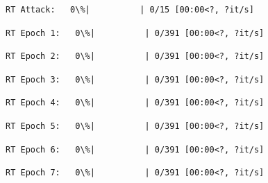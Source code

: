 \documentclass[11pt]{article}
\begin{document}
    
    \begin{Verbatim}[commandchars=\\\{\}]
RT Attack:   0\%|          | 0/15 [00:00<?, ?it/s]
    \end{Verbatim}

    
    
    \begin{Verbatim}[commandchars=\\\{\}]
RT Epoch 1:   0\%|          | 0/391 [00:00<?, ?it/s]
    \end{Verbatim}

    
    
    \begin{Verbatim}[commandchars=\\\{\}]
RT Epoch 2:   0\%|          | 0/391 [00:00<?, ?it/s]
    \end{Verbatim}

    
    
    \begin{Verbatim}[commandchars=\\\{\}]
RT Epoch 3:   0\%|          | 0/391 [00:00<?, ?it/s]
    \end{Verbatim}

    
    
    \begin{Verbatim}[commandchars=\\\{\}]
RT Epoch 4:   0\%|          | 0/391 [00:00<?, ?it/s]
    \end{Verbatim}

    
    
    \begin{Verbatim}[commandchars=\\\{\}]
RT Epoch 5:   0\%|          | 0/391 [00:00<?, ?it/s]
    \end{Verbatim}

    
    
    \begin{Verbatim}[commandchars=\\\{\}]
RT Epoch 6:   0\%|          | 0/391 [00:00<?, ?it/s]
    \end{Verbatim}

    
    
    \begin{Verbatim}[commandchars=\\\{\}]
RT Epoch 7:   0\%|          | 0/391 [00:00<?, ?it/s]
    \end{Verbatim}

    
    
\end{document}
